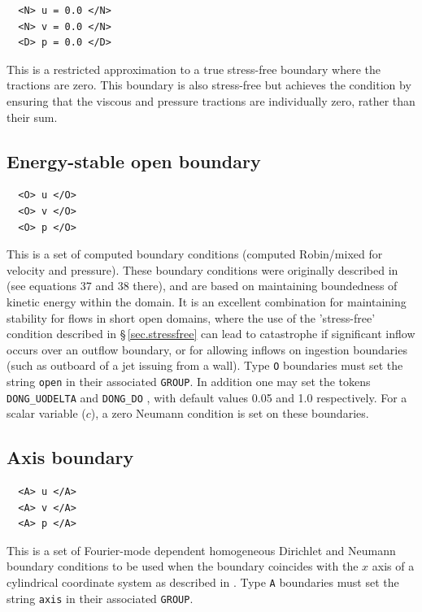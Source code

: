 \documentclass[11pt]{report}
\begin{document}
{\small
\begin{verbatim}
  <N> u = 0.0 </N>
  <N> v = 0.0 </N>
  <D> p = 0.0 </D>
\end{verbatim}
}
\noindent This is a restricted approximation to a true stress-free
boundary where the tractions are zero. This boundary is also
stress-free but achieves the condition by ensuring that the viscous
and pressure tractions are individually zero, rather than their sum.

\subsection{Energy-stable open boundary}
\label{sec.robust}

{\small
\begin{verbatim}
  <O> u </O>
  <O> v </O>
  <O> p </O>
\end{verbatim}
}
\noindent This is a set of computed boundary conditions (computed
Robin/mixed for velocity and pressure).  These boundary conditions
were originally described in \citet{dong15} (see equations 37 and 38
there), and are based on maintaining boundedness of kinetic energy
within the domain.  It is an excellent combination for maintaining
stability for flows in short open domains, where the use of the
'stress-free' condition described in \S\,\ref{sec.stressfree} can lead
to catastrophe if significant inflow occurs over an outflow boundary,
or for allowing inflows on ingestion boundaries (such as outboard of a
jet issuing from a wall).  Type \verb|O| boundaries must set the string
\verb|open| in their associated \verb|GROUP|.  In addition one may set
the tokens \verb+DONG_UODELTA+ and \verb+DONG_DO+ \citep[see][these
  are $U_o\delta$ and $D_o$]{dong15}, with default values 0.05 and 1.0
respectively.  For a scalar variable ($c$), a zero Neumann condition
is set on these boundaries.

\subsection{Axis boundary}

{\small
\begin{verbatim}
  <A> u </A>
  <A> v </A>
  <A> p </A>
\end{verbatim}
}
\noindent
This is a set of Fourier-mode dependent homogeneous Dirichlet and
Neumann boundary conditions to be used when the boundary coincides
with the $x$ axis of a cylindrical coordinate system as described in
\citet{blsh04}. Type \verb|A| boundaries must set the string
\verb|axis| in their associated \verb|GROUP|.
\end{document}
